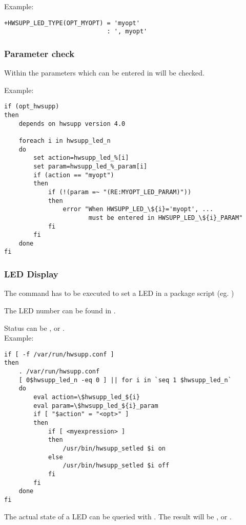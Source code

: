 Example:
\begin{verbatim}
+HWSUPP_LED_TYPE(OPT_MYOPT) = 'myopt' 
                            : ', myopt'
\end{verbatim}

\subsubsection{Parameter check}
  Within  the parameters which can be entered 
  in  will be checked.

Example:
\begin{verbatim}
if (opt_hwsupp)
then
    depends on hwsupp version 4.0

    foreach i in hwsupp_led_n
    do
        set action=hwsupp_led_%[i]
        set param=hwsupp_led_%_param[i]
        if (action == "myopt")
        then
            if (!(param =~ "(RE:MYOPT_LED_PARAM)"))
            then
                error "When HWSUPP_LED_\${i}='myopt', ...
                       must be entered in HWSUPP_LED_\${i}_PARAM" 
            fi
        fi
    done
fi
\end{verbatim}

\subsubsection {LED Display}
  The command  has to be executed
  to set a LED in a package script (eg. ) 
  
  The LED number can be found in .
  
  Status can be ,  or .\\

Example:
\begin{verbatim}
if [ -f /var/run/hwsupp.conf ]
then
    . /var/run/hwsupp.conf
    [ 0$hwsupp_led_n -eq 0 ] || for i in `seq 1 $hwsupp_led_n`
    do
        eval action=\$hwsupp_led_${i}
        eval param=\$hwsupp_led_${i}_param
        if [ "$action" = "<opt>" ]
        then
            if [ <myexpression> ]
            then
                /usr/bin/hwsupp_setled $i on
            else
                /usr/bin/hwsupp_setled $i off
            fi
        fi
    done
fi
\end{verbatim}

  The actual state of a LED can be queried with 
  .
  The result will be ,  or .
  
